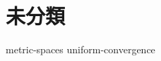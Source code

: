 \documentclass[uplatex, dvipdfmx, a4paper, 12pt, class=jsbook, crop=false]{standalone}
\begin{document}
\chapter{未分類}
\label{chap:uncategorized}

{metric-spaces}
{uniform-convergence}
\end{document}

